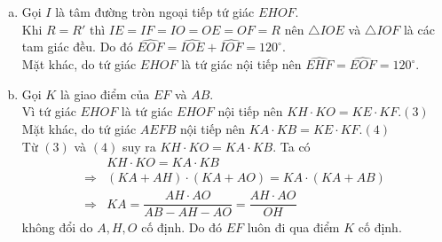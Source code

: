 \begin{ex}
{\begin{enumerate}[a)]
Từ đó suy ra \[\widehat{EFH}=\dfrac{1}{2}\text{sđ $\stackrel\frown{EP}$}=\text{sđ $\stackrel\frown{EA}$}=\widehat{EOH},\]
do đó tứ giác $EHOF$ nội tiếp đường tròn.
	\item Gọi $I$ là tâm đường tròn ngoại tiếp tứ giác $EHOF$.\\ Khi  $R=R'$ thì $IE=IF=IO=OE=OF=R$ nên $\triangle IOE$ và $\triangle IOF$ là các tam giác đều. Do đó $\widehat{EOF}=\widehat{IOE}+\widehat{IOF}=120^\circ$.\\
	Mặt khác, do tứ giác $EHOF$ là tứ giác nội tiếp nên $\widehat{EHF}=\widehat{EOF}=120^\circ$.
	\item Gọi $K$ là giao điểm của $EF$ và $AB$.\\ Vì tứ giác $EHOF$ là tứ giác $EHOF$ nội tiếp nên $KH\cdot KO=KE\cdot KF$.\hfill$(3)$\\
	Mặt khác, do tứ giác $AEFB$ nội tiếp nên $KA\cdot KB=KE\cdot KF$.\hfill$(4)$\\
	Từ $(3)$ và $(4)$ suy ra $KH\cdot KO=KA\cdot KB$. Ta có
	\begin{align*}
	&KH\cdot KO=KA\cdot KB\\ 
	\Rightarrow&(KA+AH)\cdot (KA+AO)=KA\cdot (KA+AB)\\
	\Rightarrow&KA=\dfrac{AH\cdot AO}{AB-AH-AO}=\dfrac{AH\cdot AO}{OH}
	\end{align*}
	không đổi do $A,H,O$ cố định. Do đó $EF$ luôn đi qua điểm $K$ cố định.
\end{enumerate}
    }
\end{ex}

